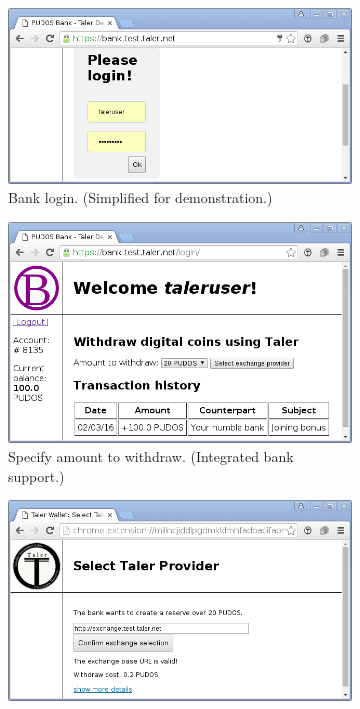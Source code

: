 \documentclass{IEEEtran}
\begin{document}
\begin{figure}
\begin{subfigure}{\linewidth}
\includegraphics[width=\linewidth]{figs/bank0a.png}
\caption{Bank login. (Simplified for demonstration.)}
\label{subfig:login}
\end{subfigure}
\begin{subfigure}{\linewidth}
\includegraphics[width=\linewidth]{figs/bank1a.png}
\caption{Specify amount to withdraw. (Integrated bank support.)}
\label{subfig:withdraw}
\end{subfigure}
\begin{subfigure}{\linewidth}
\includegraphics[width=\linewidth]{figs/bank2a.png}

\end{subfigure}
\end{figure}
\end{document}
